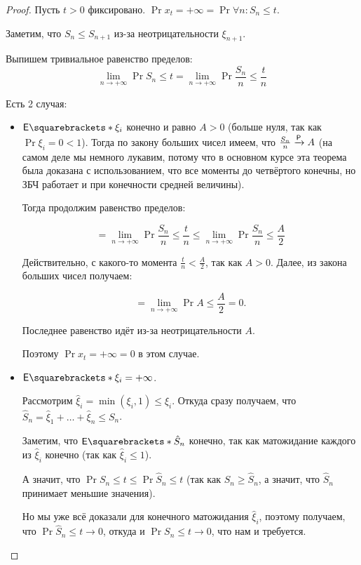 \begin{proof}
  Пусть $t > 0$ фиксировано. $\Pr{x_t = +\infty} = \Pr{\forall n : S_n \leq t}$.

  Заметим, что $S_n \leq S_{n + 1}$ из-за неотрицательности $\xi_{n + 1}$.

  Выпишем тривиальное равенство пределов:
  \[
    \lim\limits_{n \to +\infty} \Pr{S_n \leq t} = \lim\limits_{n \to +\infty} \Pr{\frac{S_n}{n} \leq \frac{t}{n}}
  \]

  Есть 2 случая:

  \begin{itemize}
    \item $\E{\xi_i}$ конечно и равно $A > 0$ (больше нуля, так как $\Pr{\xi_i = 0} < 1$).
    Тогда по закону больших чисел имеем,
    что $\frac{S_n}{n} \prto A$ (на самом деле мы немного лукавим, потому что
    в основном курсе эта теорема была доказана с использованием, что все моменты до четвёртого конечны,
    но ЗБЧ работает и при конечности средней величины).

    Тогда продолжим равенство пределов:

    \[
      = \lim\limits_{n \to +\infty} \Pr{\frac{S_n}{n} \leq \frac{t}{n}} \leq
      \lim\limits_{n \to +\infty} \Pr{\frac{S_n}{n} \leq \frac{A}{2}}
    \]

    Действительно, с какого-то момента $\frac{t}{n} < \frac{A}{2}$, так как
    $A > 0$. Далее, из закона больших чисел получаем:

    \[
      = \lim\limits_{n \to +\infty} \Pr{A \leq \frac{A}{2}} = 0.
    \]

    Последнее равенство идёт из-за неотрицательности $A$.

    Поэтому $\Pr{x_t = +\infty} = 0$ в этом случае.

    \item $\E{\xi_i} = +\infty$.

    Рассмотрим $\hat{\xi}_i = \min(\xi_i, 1) \leq \xi_i$. Откуда сразу получаем,
    что $\hat{S}_n = \hat{\xi}_1 + \ldots + \hat{\xi}_n \leq S_n$.

    Заметим, что $\E{\hat{S}_n}$ конечно, так как матожидание каждого из
    $\hat{\xi}_i$ конечно (так как $\hat{\xi}_i \leq 1$).

    А значит, что $\Pr{S_n \leq t} \leq \Pr{\hat{S}_n \leq t}$ (так как
    $S_n \geq \hat{S}_n$, а значит, что $\hat{S}_n$ принимает меньшие значения).

    Но мы уже всё доказали для конечного матожидания $\hat{\xi}_i$, поэтому получаем,
    что $\Pr{\hat{S}_n \leq t} \to 0$, откуда и $\Pr{S_n \leq t} \to 0$, что нам и требуется.
  \end{itemize}

\end{proof}

